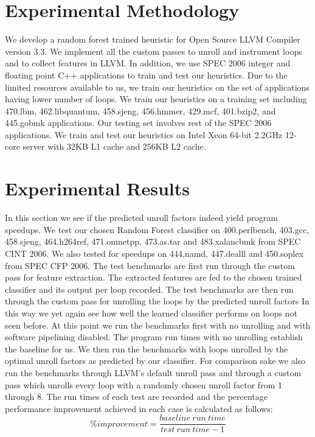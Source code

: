 \documentclass[]{sig-alternate}
\begin{document}


\section{Experimental Methodology}\label{sec:experimental_methodology}
We develop a random forest trained heuristic for Open Source LLVM Compiler version 3.3. We implement all the custom passes to unroll and instrument loops and to collect features in LLVM. In addition, we use SPEC 2006 integer and floating point C++ applications to train and test our heuristics. Due to the limited resources available to us, we train our heuristics on the set of applications having lower number of loops. We train our heuristics on a training set including 470.lbm, 462.libquantum, 458.sjeng, 456.hmmer, 429.mcf, 401.bzip2, and 445.gobmk applications. Our testing set involves rest of the SPEC 2006 applications. We train and test our heuristics on Intel Xeon 64-bit 2.2GHz 12-core server with 32KB L1 cache and 256KB L2 cache.


\section{Experimental Results}\label{sec:experimental_results}
In this section we see if the predicted unroll factors indeed yield program speedups. We test our chosen Random Forest classifier on  400.perlbench, 403.gcc, 458.sjeng, 464.h264ref, 471.omnetpp, 473.as.tar and 483.xalancbmk from SPEC CINT 2006. We also tested for speedups on 444.namd, 447.dealll and 450.soplex from SPEC CFP 2006. The test benchmarks are first run through the custom pass for feature extraction. The extracted features are fed to the chosen trained classifier and its output per loop recorded. The test benchmarks are then run through the custom pass for unrolling the loops by the predicted unroll factors In this way we yet again see how well the learned classifier performs on loops not seen before. At this point we run the benchmarks first with no unrolling and with software pipelining disabled. The program run times with no unrolling establish the baseline for us. We then run the benchmarks with loops unrolled by the optimal unroll factors as predicted by our classifier. For comparison sake we also run the benchmarks through LLVM's default unroll pass and through a custom pass which unrolls every loop with a randomly chosen unroll factor from 1 through 8. The run times of each test are recorded and the percentage performance improvement achieved in each case is calculated as follows:
\begin{equation}
 \% improvement = \frac{baseline\ run\  time}{test\ run\ time - 1}
\end{equation}
\end{document}
